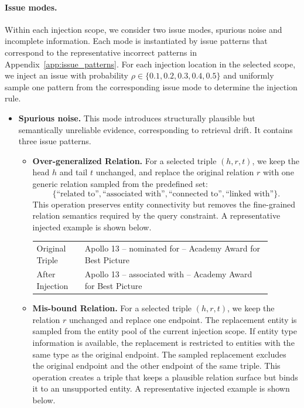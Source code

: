 \documentclass{article}
\theoremstyle{plain}
\theoremstyle{definition}
\theoremstyle{remark}
\begin{document}
\paragraph{Issue modes.}
Within each injection scope, we consider two issue modes, spurious noise and incomplete information. 
Each mode is instantiated by issue patterns that correspond to the representative incorrect patterns in Appendix~\ref{app:issue_patterns}. 
For each injection location in the selected scope, we inject an issue with probability $\rho \in \{0.1,0.2,0.3,0.4,0.5\}$ and uniformly sample one pattern from the corresponding issue mode to determine the injection rule.

\begin{itemize}
    \item \textbf{Spurious noise.}
    This mode introduces structurally plausible but semantically unreliable evidence, corresponding to retrieval drift. 
    It contains three issue patterns.

    \begin{itemize}
        \item \textbf{Over-generalized Relation.}
        For a selected triple $(h,r,t)$, we keep the head $h$ and tail $t$ unchanged, and replace the original relation $r$ with one generic relation sampled from the predefined set:
        \[
        \{\text{``related to''}, \text{``associated with''}, \text{``connected to''}, \text{``linked with''}\}.
        \]
        This operation preserves entity connectivity but removes the fine-grained relation semantics required by the query constraint. A representative injected example is shown below.

        \begin{center}
        \small
        \begin{tabular}{@{}p{0.18\linewidth}p{0.7\linewidth}@{}}
        \toprule
        Original Triple & \small
        Apollo 13 -- nominated for -- Academy Award for Best Picture \\
        After Injection & \small
        Apollo 13 -- associated with -- Academy Award for Best Picture \\
        \bottomrule
        \end{tabular}
        \end{center}

        \item \textbf{Mis-bound Relation.}
        For a selected triple $(h,r,t)$, we keep the relation $r$ unchanged and replace one endpoint. 
        The replacement entity is sampled from the entity pool of the current injection scope. 
        If entity type information is available, the replacement is restricted to entities with the same type as the original endpoint. 
        The sampled replacement excludes the original endpoint and the other endpoint of the same triple. 
        This operation creates a triple that keeps a plausible relation surface but binds it to an unsupported entity. A representative injected example is shown below.


\end{itemize}
\end{itemize}
\end{document}
